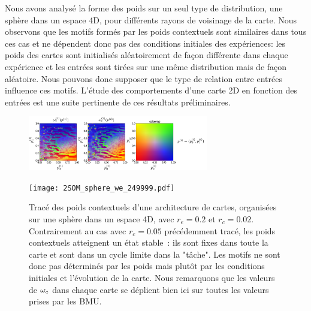 \documentclass[../main]{subfiles}
\begin{document}
Nous avons analysé la forme des poids sur un seul type de distribution, une sphère dans un espace 4D, pour différents rayons de voisinage de la carte.
Nous observons que les motifs formés par les poids contextuels sont similaires dans tous ces cas et ne dépendent donc pas des conditions initiales des expériences: les poids des cartes sont initialisés aléatoirement de façon différente dans chaque expérience et les entrées sont tirées sur une même distribution mais de façon aléatoire.
Nous pouvons donc supposer que le type de relation entre entrées influence ces motifs. L'étude des comportements d'une carte 2D en fonction des entrées est une suite pertinente de ces résultats préliminaires.



\begin{figure}
	\begin{minipage}{\textwidth}
		\centering\includegraphics[width=0.7\textwidth]{wc_s_002_legend.pdf}
		\label{fig:2som_s_we}
	\end{minipage}
	\begin{minipage}{\textwidth}
		\texttt{[image: 2SOM\_sphere\_we\_249999.pdf]}
		\caption{Tracé des poids contextuels d'une architecture de cartes, organisées sur une sphère dans un espace 4D, avec $r_e =0.2$ et $r_c = 0.02$. Contrairement au cas avec $r_c = 0.05$ précédemment tracé, les poids contextuels atteignent un état stable~: ils sont fixes dans toute la carte et sont dans un cycle limite dans la "tâche". Les motifs ne sont donc pas déterminés par les poids mais plutôt par les conditions initiales et l'évolution de la carte. Nous remarquons que les valeurs de $\omega_c$ dans chaque carte se déplient bien ici sur toutes les valeurs prises par les BMU.
		\label{fig:2som_s_002_wc}}
	\end{minipage}
\end{figure}
\end{document}
